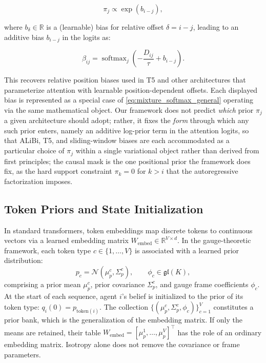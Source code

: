 \documentclass[twoside,11pt]{article}
\begin{document}
\begin{equation}
\pi_j \propto \exp(b_{i-j}),
\label{eq:relative_bias_prior}
\end{equation}

where $b_\delta \in \mathbb{R}$ is a (learnable) bias for relative offset $\delta = i - j$, leading to an additive bias $b_{i-j}$ in the logits as:

\begin{equation}
\beta_{ij} = \operatorname{softmax}_j \left(-\frac{D_{ij}}{\tau} + b_{i-j}\right).
\label{eq:relative_bias_attention}
\end{equation}

This recovers relative position biases used in T5 \citep{raffel2020exploring} and other architectures that parameterize attention with learnable position-dependent offsets. Each displayed bias is represented as a special case of \eqref{eq:mixture_softmax_general} operating via the same mathematical object. Our framework does not predict \emph{which} prior $\pi_j$ a given architecture should adopt; rather, it fixes the \emph{form} through which any such prior enters, namely an additive log-prior term in the attention logits, so that ALiBi, T5, and sliding-window biases are each accommodated as a particular choice of $\pi_j$ within a single variational object rather than derived from first principles; the causal mask is the one positional prior the framework does fix, as the hard support constraint $\pi_k = 0$ for $k > i$ that the autoregressive factorization imposes.



\subsection{Token Priors and State Initialization}
\label{sec:embeddings}

In standard transformers, token embeddings map discrete tokens to continuous vectors via a learned embedding matrix $W_{\text{embed}} \in \mathbb{R}^{V \times d}$. In the gauge-theoretic framework, each token type $c \in \{1, \ldots, V\}$ is associated with a learned prior distribution:
\begin{equation}
p_c = \mathcal{N}(\mu_p^c, \Sigma_p^c), \qquad \phi_c \in \mathfrak{gl}(K),
\label{eq:prior_bank}
\end{equation}
comprising a prior mean $\mu_p^c$, prior covariance $\Sigma_p^c$, and gauge frame coefficients $\phi_c$. At the start of each sequence, agent $i$'s belief is initialized to the prior of its token type: $q_i(0) = p_{\mathrm{token}(i)}$. The collection $\{(\mu_p^c, \Sigma_p^c, \phi_c)\}_{c=1}^V$ constitutes a prior bank, which is the generalization of the embedding matrix. If only the means are retained, their table $W_{\mathrm{embed}}=[\mu_p^1,\ldots,\mu_p^V]^\top$ has the role of an ordinary embedding matrix. Isotropy alone does not remove the covariance or frame parameters.
\end{document}
